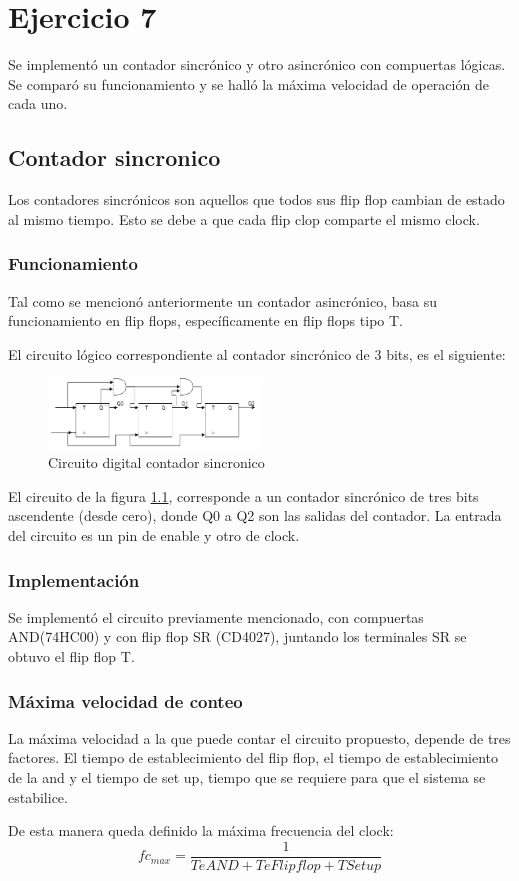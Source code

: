 \documentclass[../../e3_tp2_main.tex]{subfiles}
\begin{document}
\chapter{Ejercicio 7}
Se implementó un contador sincrónico y otro asincrónico con compuertas lógicas. Se comparó su funcionamiento y se halló la máxima velocidad de operación de cada uno.

\section{Contador sincronico}
Los contadores sincrónicos son aquellos que todos sus flip flop cambian de estado al mismo tiempo. Esto se debe a que cada flip clop comparte el mismo clock.
\subsection{Funcionamiento}
Tal como se mencionó anteriormente un contador asincrónico, basa su funcionamiento en flip flops, específicamente en flip flops tipo T.
\par El circuito lógico correspondiente al contador sincrónico de 3 bits, es el siguiente:


\begin{figure}[H]	
	\centering
	\includegraphics[width=0.5\textwidth]{imagenes/cs_b.png}
	\caption{Circuito digital contador sincronico}\label{fig:cse}
\end{figure}
El circuito de la figura \ref{fig:cse}, corresponde a un contador sincrónico de tres bits ascendente (desde cero), donde Q0 a Q2 son las salidas del contador. La entrada del circuito es un pin de enable y otro de clock.

\subsection{Implementación}

Se implementó el circuito previamente mencionado, con compuertas AND(74HC00) y con flip flop SR (CD4027), juntando los terminales SR se obtuvo el flip flop T.

\subsection{Máxima velocidad de conteo}
La máxima velocidad a la que puede contar el circuito propuesto, depende de tres factores. El tiempo de establecimiento del flip flop, el tiempo de establecimiento de la and y el tiempo de set up, tiempo que se requiere para que el sistema se estabilice.
\par De esta manera queda definido la máxima frecuencia del clock:
$$fc_{max}=\frac{1}{TeAND +TeFlipflop +TSetup   } $$
\end{document}
